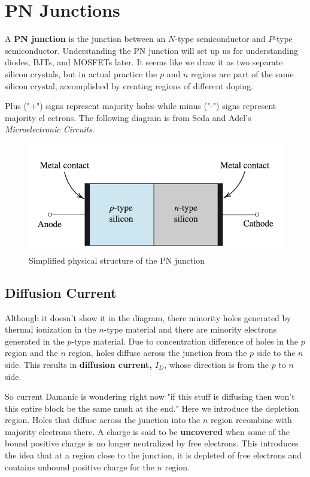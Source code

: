 \section{PN Junctions}

A \textbf{PN junction} is the junction between an $N$-type semiconductor and $P$-type semiconductor. Understanding the PN junction will set up us for understanding diodes, BJTs, and MOSFETs later. It seems like we draw it as two separate silicon crystals, but in actual practice the $p$ and $n$ regions are part of the same silicon crystal, accomplished by creating regions of different doping.

Plus ("+") signs represent majority holes while minus ("-") signs represent majority el ectrons. The following diagram is from Seda and Adel's \textit{Microelectronic Circuits}.

\begin{figure}[H]
    \centering
    \includegraphics[scale=0.5]{figs/ch03/pn_junction.png}
    \caption{Simplified physical structure of the PN junction}
\end{figure}

\subsection{Diffusion Current}
Although it doesn't show it in the diagram, there minority holes generated by thermal ionization in the $n$-type material and there are minority electrons generated in the $p$-type material. Due to concentration difference of holes in the $p$ region and the $n$ region, holes diffuse across the junction from the $p$ side to the $n$ side. This results in \textbf{diffusion current, $I_D$}, whose direction is from the $p$ to $n$ side.

So current Damanic is wondering right now "if this stuff is diffusing then won't this entire block be the same mush at the end." Here we introduce the depletion region. Holes that diffuse across the junction into the $n$ region recombine with majority electrons there. A charge is said to be \textbf{uncovered} when some of the bound positive charge is no longer neutralized by free electrons. This introduces the idea that at a region close to the junction, it is depleted of free electrons and contains unbound positive charge for the $n$ region.

